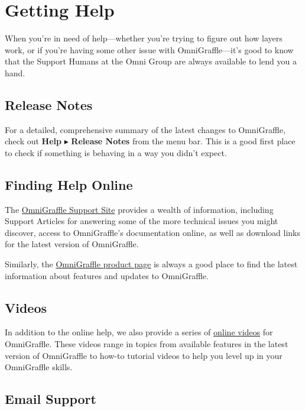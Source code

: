 \documentclass[../main.tex]{subfiles}
\begin{document}
\chapter{Getting Help}

When you're in need of help---whether you're trying to figure out how layers work, or if you're
having some other issue with OmniGraffle---it's good to know that the Support Humans at the
Omni Group are always available to lend you a hand.

\section{Release Notes}

For a detailed, comprehensive summary of the latest changes to OmniGraffle, check out
\textbf{Help} $\blacktriangleright$ \textbf{Release Notes} from the menu bar. This is a good
first place to check if something is behaving in a way you didn't expect.

\section{Finding Help Online}

The \href{https://support.omnigroup.com/omnigraffle}{OmniGraffle Support Site} provides a wealth
of information, including Support Articles for answering some of the more technical issues you
might discover, access to OmniGraffle's documentation online, as well as download links for
the latest version of OmniGraffle.

Similarly, the \href{https://www.omnigroup.com/products/omnigraffle}{OmniGraffle product page}
is always a good place to find the latest information about features and updates to
OmniGraffle.

\section{Videos}

In addition to the online help, we also provide a series of
\href{https://www.omnigroup.com/video/omnigraffle/}{online videos} for OmniGraffle. These
videos range in topics from available features in the latest version of OmniGraffle to how-to
tutorial videos to help you level up in your OmniGraffle skills.

\section{Email Support}
\end{document}
